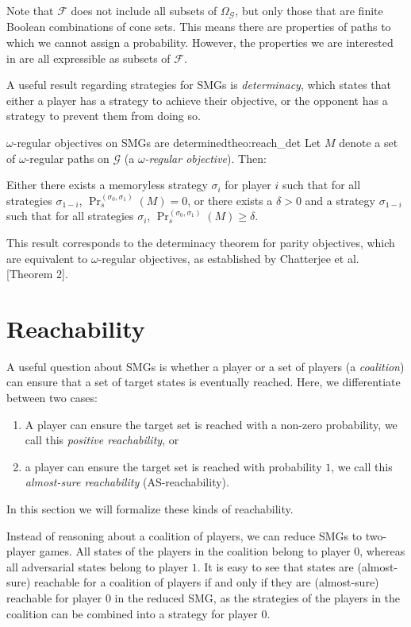 Note that $\mathcal{F}$ does not include all subsets of $\Omega_\mathcal{G}$, but only those that are finite Boolean combinations of cone sets. This means there are properties of paths to which we cannot assign a probability. However, the properties we are interested in are all expressible as subsets of $\mathcal{F}$.

A useful result regarding strategies for SMGs is \textit{determinacy}, which states that either a player has a strategy to achieve their objective, or the opponent has a strategy to prevent them from doing so.
\begin{mytheorem}{$\omega$-regular objectives on SMGs are determined}{theo:reach_det}\label{theo:reach_det}
Let $M$ denote a set of $\omega$-regular paths on $\mathcal{G}$ (a \textit{$\omega$-regular objective}). Then:

Either there exists a memoryless strategy $\sigma_i$ for player $i$ such that for all strategies $\sigma_{1-i}$, $\Pr_s^{(\sigma_0, \sigma_1)}(M) = 0$, or there exists a $\delta > 0$ and a strategy $\sigma_{1-i}$ such that for all strategies $\sigma_i$, $\Pr_s^{(\sigma_0, \sigma_1)}(M) \geq \delta$.
\end{mytheorem}
This result corresponds to the determinacy theorem for parity objectives, which are equivalent to $\omega$-regular objectives, as established by Chatterjee et al. \cite{chatterjee_stochastic_2007}[Theorem 2].

\section{Reachability}

A useful question about SMGs is whether a player or a set of players (a \textit{coalition}) can ensure that a set of target states is eventually reached. Here, we differentiate between two cases:
\begin{enumerate}
    \item A player can ensure the target set is reached with a non-zero probability, we call this \textit{positive reachability}, or
    \item a player can ensure the target set is reached with probability $1$, we call this \textit{almost-sure reachability} (AS-reachability).
\end{enumerate}
In this section we will formalize these kinds of reachability.

Instead of reasoning about a coalition of players, we can reduce SMGs to two-player games. All states of the players in the coalition belong to player $0$, whereas all adversarial states belong to player $1$. It is easy to see that states are (almost-sure) reachable for a coalition of players if and only if they are (almost-sure) reachable for player $0$ in the reduced SMG, as the strategies of the players in the coalition can be combined into a strategy for player $0$.

